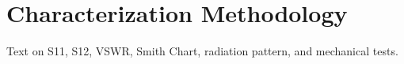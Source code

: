 \section{Characterization Methodology}
Text on S11, S12, VSWR, Smith Chart, radiation pattern, and mechanical tests.
